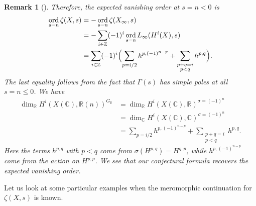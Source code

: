 \documentclass[10pt,a4paper,oneside]{article}
\DeclareMathOperator{\ord}{ord}
\newcommand{\CC}{\mathbb{C}}
\newcommand{\RR}{\mathbb{R}}
\newcommand{\ZZ}{\mathbb{Z}}
\theoremstyle{myplain}
\theoremstyle{mydefinition}
\newtheorem{remark}[theorem]{Remark}
\numberwithin{equation}{section}
\begin{document}
\begin{remark}[{\cite[Proposition~5.13]{Flach-Morin-2018}}]
  Therefore, the expected vanishing order at $s = n < 0$ is
  \begin{align*}
    \ord_{s=n} \zeta (X,s) & = -\ord_{s=n} \zeta (X_\infty,s) \\
                           & = -\sum_{i\in \ZZ} (-1)^i \ord_{s=n} L_\infty (H^i (X), s) \\
                           & = \sum_{i\in \ZZ} (-1)^i \Bigl(\sum_{p = i/2} h^{p,(-1)^{n-p}} +
    \sum_{\substack{p + q = i \\ p < q}} h^{p,q}\Bigr).
  \end{align*}
  The last equality follows from the fact that $\Gamma (s)$ has simple poles at
  all $s = n \le 0$. We have
  \begin{align*}
    \dim_\RR H^i (X (\CC), \RR (n))^{G_\RR} & = \dim_\RR H^i (X (\CC), \RR)^{\sigma = (-1)^n} \\
                                            & = \dim_\CC H^i (X (\CC), \CC)^{\sigma = (-1)^n} \\
                                            & = \sum_{p = i/2} h^{p,(-1)^{n-p}} + \sum_{\substack{p + q = i \\ p < q}} h^{p,q}.
  \end{align*}
  Here the terms $h^{p,q}$ with $p < q$ come from $\sigma (H^{p,q}) = H^{q,p}$,
  while $h^{p,(-1)^{n-p}}$ come from the action on $H^{p,p}$.
  We see that our conjectural formula recovers the expected vanishing order.
\end{remark}

Let us look at some particular examples when the meromorphic continuation for
$\zeta (X,s)$ is known.
\end{document}
